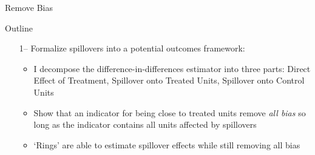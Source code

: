 \documentclass[aspectratio=169]{beamer}
\begin{document}
\begin{frame}{Remove Bias}

\end{frame}



\begin{frame}{Outline}

    \begin{itemize}
        \item[1--] Formalize spillovers into a potential outcomes framework:
 
        \begin{citecolor}
        \end{citecolor}

        \begin{itemize}
            \vspace{2.5mm}
            \item I decompose the difference-in-differences estimator into three parts: Direct Effect of Treatment, Spillover onto Treated Units, Spillover onto Control Units
            
            \vspace{2.5mm}
            \item Show that an indicator for being close to treated units remove \textit{all bias} so long as the indicator contains all units affected by spillovers
            
            \vspace{2.5mm}
            \item `Rings' are able to estimate spillover effects while still removing all bias
        \end{itemize} 

    \end{itemize}
\end{frame}
\end{document}
